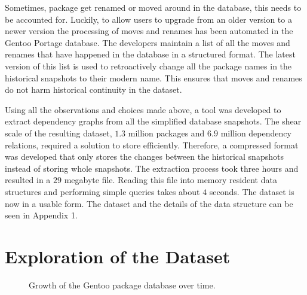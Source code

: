 \documentclass[smallextended,final]{svjour3}
\begin{document}
Sometimes, package get renamed or moved around in the database, this needs to be accounted for. Luckily, to allow users to upgrade from an older version to a newer version the processing of moves and renames has been automated in the Gentoo Portage database. The developers maintain a list of all the moves and renames that have happened in the database in a structured format. The latest version of this list is used to retroactively change all the package names in the historical snapshots to their modern name. This ensures that moves and renames do not harm historical continuity in the dataset.

Using all the observations and choices made above, a tool was developed to extract dependency graphs from all the simplified database snapshots. The shear scale of the resulting dataset, $1.3$ million packages and $6.9$ million dependency relations, required a solution to store efficiently. Therefore, a compressed format was developed that only stores the changes between the historical snapshots instead of storing whole snapshots. The extraction process took three hours and resulted in a $29$ megabyte file. Reading this file into memory resident data structures and performing simple queries takes about $4$ seconds. The dataset is now in a usable form. The dataset and the details of the data structure can be seen in Appendix 1.



\section{Exploration of the Dataset}

\begin{figure}
\small\centering
{}
\caption{Growth of the Gentoo package database over time.}\label{fig:pkgsgrowth}
\end{figure}
\end{document}

